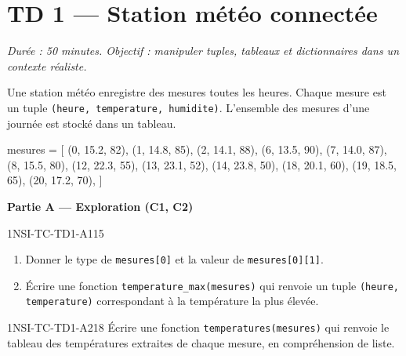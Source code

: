 \section*{TD 1 --- Station météo connectée}
\textit{Durée : 50 minutes. Objectif : manipuler tuples, tableaux et dictionnaires
dans un contexte réaliste.}

\bigskip

Une station météo enregistre des mesures toutes les heures. Chaque mesure est un
tuple \lstinline{(heure, temperature, humidite)}. L'ensemble des mesures d'une
journée est stocké dans un tableau.

\begin{python}
mesures = [
    (0, 15.2, 82), (1, 14.8, 85), (2, 14.1, 88),
    (6, 13.5, 90), (7, 14.0, 87), (8, 15.5, 80),
    (12, 22.3, 55), (13, 23.1, 52), (14, 23.8, 50),
    (18, 20.1, 60), (19, 18.5, 65), (20, 17.2, 70),
]
\end{python}

\textbf{Partie A --- Exploration (C1, C2)}

\begin{exercice}{1NSI-TC-TD1-A1}{1}{5}
\begin{enumerate}
  \item Donner le type de \lstinline{mesures[0]} et la valeur de
        \lstinline{mesures[0][1]}.
  \item Écrire une fonction \lstinline{temperature_max(mesures)} qui renvoie
        un tuple \lstinline{(heure, temperature)} correspondant à la
        température la plus élevée.
\end{enumerate}
\end{exercice}


\begin{exercice}{1NSI-TC-TD1-A2}{1}{8}
Écrire une fonction \lstinline{temperatures(mesures)} qui renvoie le tableau
des températures extraites de chaque mesure, en compréhension de liste.
\end{exercice}

